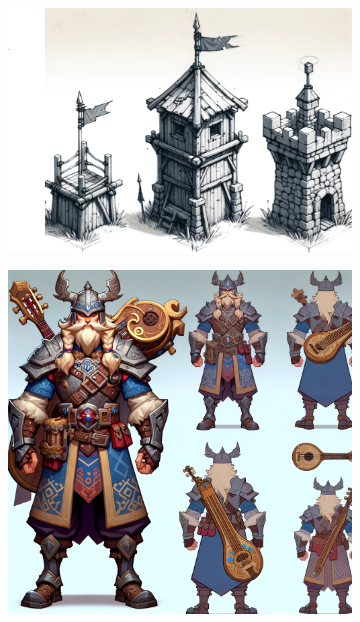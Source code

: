\documentclass[a4paper,10pt,english]{article}
\begin{document}
\begin{figure}[h]

\centering

\begin{subfigure}{0.29\linewidth}
\includegraphics[width=1.2\linewidth]{capturepoint.png}
\label{Fig:Style1A}
\end{subfigure}\hfill
%
\begin{subfigure}{0.29\linewidth}
\includegraphics[width=\linewidth]{bard main.png}
\label{Fig:Style1B}
\end{subfigure}\hfill
\end{figure}
\end{document}
